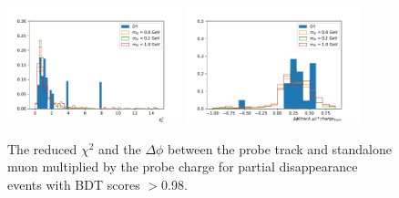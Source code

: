 \begin{figure}[htbp]
	\centering
	\includegraphics[width=0.45\textwidth]{figures/partDisStaChi.pdf}
	\hspace{0.01\textwidth}
	\includegraphics[width=0.45\textwidth]{figures/partDisStaPhi.pdf}
	\caption[Expected Partial Disappearance Standalone Muon Quality]{The reduced $\chi^{2}$ and the $\Delta\phi$ between the probe track and standalone muon multiplied by the probe charge for partial disappearance events with BDT scores $>$0.98.}
	\label{fig:partStaFeat}
\end{figure}

